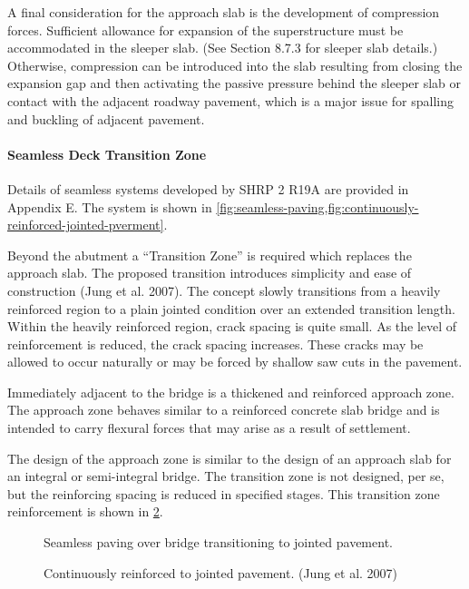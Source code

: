 A final consideration for the approach slab is the development of compression forces. Sufficient allowance for
expansion of the superstructure must be accommodated in the sleeper slab. (See Section 8.7.3 for sleeper slab details.)
Otherwise, compression can be introduced into the slab resulting from closing the expansion gap and then activating
the passive pressure behind the sleeper slab or contact with the adjacent roadway pavement, which is a major issue for
spalling and buckling of adjacent pavement.





\paragraph{Seamless Deck Transition Zone}
Details of seamless systems developed by SHRP 2 R19A are provided in Appendix E. The system is shown in \cref{fig:seamless-paving,fig:continuously-reinforced-jointed-pverment}.

Beyond the abutment a “Transition Zone” is required which replaces the approach slab. The proposed transition
introduces simplicity and ease of construction (Jung et al. 2007). The concept slowly transitions from a heavily
reinforced region to a plain jointed condition over an extended transition length. Within the heavily reinforced region,
crack spacing is quite small. As the level of reinforcement is reduced, the crack spacing increases. These cracks may
be allowed to occur naturally or may be forced by shallow saw cuts in the pavement.

Immediately adjacent to the bridge is a thickened and reinforced approach zone. The approach zone behaves
similar to a reinforced concrete slab bridge and is intended to carry flexural forces that may arise as a result of
settlement.

The design of the approach zone is similar to the design of an approach slab for an integral or semi-integral
bridge. The transition zone is not designed, per se, but the reinforcing spacing is reduced in specified stages. This
transition zone reinforcement is shown in \cref{fig:continuously-reinforced-jointed-pverment}.

\begin{figure}
  \caption{Seamless paving over bridge transitioning to jointed pavement.}
  \label{fig:seamless-paving}
\end{figure}

\begin{figure}
  \caption{Continuously reinforced to jointed pavement. (Jung et al. 2007)}
  \label{fig:continuously-reinforced-jointed-pverment}
\end{figure}

